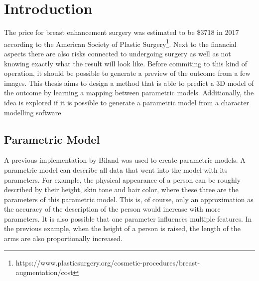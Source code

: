 \setcounter{chapter}{0}

\chapter{Introduction}

The price for breast enhancement surgery was estimated to be \$3718 in 2017 according to the American Society of Plastic Surgery\footnote{https://www.plasticsurgery.org/cosmetic-procedures/breast-augmentation/cost}. Next to the financial aspects there are also risks connected to undergoing surgery as well as not knowing exactly what the result will look like. Before commiting to this kind of operation, it should be possible to generate a preview of the outcome from a few images. This thesis aims to design a method that is able to predict a 3D model of the outcome by learning a mapping between parametric models. Additionally, the idea is explored if it is possible to generate a parametric model from a character modelling software.




\section{Parametric Model}
A previous implementation by Biland \cite{Biland17} was used to create parametric models. A parametric model can describe all data that went into the model with its parameters. For example, the physical appearance of a person can be roughly described by their height, skin tone and hair color, where these three are the parameters of this parametric model. This is, of course, only an approximation as the accuracy of the description of the person would increase with more parameters. It is also possible that one parameter influences multiple features. In the previous example, when the height of a person is raised, the length of the arms are also proportionally increased.

